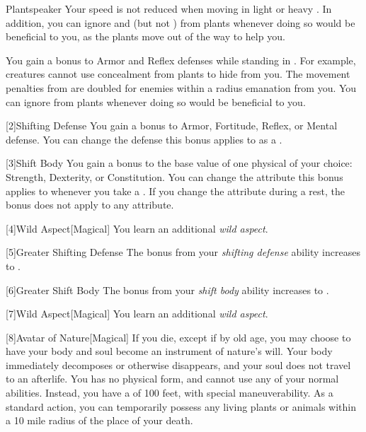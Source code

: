 {            \begin{freeability}{Plantspeaker}
                Your speed is not reduced when moving in light or heavy .
                In addition, you can ignore  and  (but not ) from plants whenever doing so would be beneficial to you, as the plants move out of the way to help you.

                \rankline
                 You gain a  bonus to Armor and Reflex defenses while standing in .
                For example, creatures cannot use concealment from plants to hide from you.
                 The movement penalties from  are doubled for enemies within a \areahuge radius emanation from you.
                 You can ignore  from plants whenever doing so would be beneficial to you.
            \end{freeability}
        }

        [2]{Shifting Defense} You gain a  bonus to Armor, Fortitude, Reflex, or Mental defense.
        You can change the defense this bonus applies to as a .

        [3]{Shift Body} You gain a  bonus to the base value of one physical  of your choice: Strength, Dexterity, or Constitution.
        You can change the attribute this bonus applies to whenever you take a .
        If you change the attribute during a rest, the bonus does not apply to any attribute.

        [4]{Wild Aspect}[Magical]
        You learn an additional \textit{wild aspect}.

        [5]{Greater Shifting Defense}
        The bonus from your \textit{shifting defense} ability increases to .

        [6]{Greater Shift Body}
        The bonus from your \textit{shift body} ability increases to .

        [7]{Wild Aspect}[Magical]
        You learn an additional \textit{wild aspect}.

        [8]{Avatar of Nature}[Magical]
        If you die, except if by old age, you may choose to have your body and soul become an instrument of nature's will.
        Your body immediately decomposes or otherwise disappears, and your soul does not travel to an afterlife.
        You has no physical form, and cannot use any of your normal abilities.
        Instead, you have a  of 100 feet, with special maneuverability.
        As a standard action, you can temporarily possess any living plants or animals within a 10 mile radius of the place of your death.

